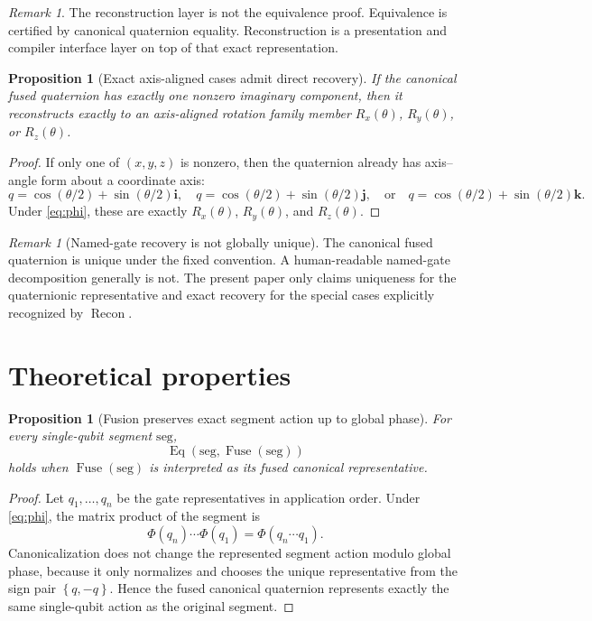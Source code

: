 \documentclass[11pt]{article}
\newtheorem{proposition}[definition]{Proposition}
\theoremstyle{remark}
\newtheorem{remark}[definition]{Remark}
\newcommand{\ii}{\mathbf{i}}
\newcommand{\jj}{\mathbf{j}}
\newcommand{\kk}{\mathbf{k}}
\newcommand{\set}[1]{\left\{ #1 \right\}}
\newcommand{\Fuse}{\operatorname{Fuse}}
\newcommand{\Recon}{\operatorname{Recon}}
\newcommand{\Eq}{\operatorname{Eq}}
\begin{document}
\begin{remark}
The reconstruction layer is not the equivalence proof. Equivalence is certified
by canonical quaternion equality. Reconstruction is a presentation and compiler
interface layer on top of that exact representation.
\end{remark}

\begin{proposition}[Exact axis-aligned cases admit direct recovery]
If the canonical fused quaternion has exactly one nonzero imaginary component,
then it reconstructs exactly to an axis-aligned rotation family member
$R_x(\theta)$, $R_y(\theta)$, or $R_z(\theta)$.
\end{proposition}

\begin{proof}
If only one of $(x,y,z)$ is nonzero, then the quaternion already has
axis--angle form about a coordinate axis:
\[
q=\cos(\theta/2)+\sin(\theta/2)\ii,
\quad
q=\cos(\theta/2)+\sin(\theta/2)\jj,
\quad \text{or} \quad
q=\cos(\theta/2)+\sin(\theta/2)\kk.
\]
Under \eqref{eq:phi}, these are exactly $R_x(\theta)$, $R_y(\theta)$, and
$R_z(\theta)$.
\end{proof}

\begin{remark}[Named-gate recovery is not globally unique]
The canonical fused quaternion is unique under the fixed convention. A
human-readable named-gate decomposition generally is not. The present paper only
claims uniqueness for the quaternionic representative and exact recovery for the
special cases explicitly recognized by $\Recon$.
\end{remark}

\section{Theoretical properties}

\begin{proposition}[Fusion preserves exact segment action up to global phase]
For every single-qubit segment $\mathrm{seg}$,
\[
\Eq(\mathrm{seg},\Fuse(\mathrm{seg}))
\]
holds when $\Fuse(\mathrm{seg})$ is interpreted as its fused canonical
representative.
\end{proposition}

\begin{proof}
Let $q_1,\dots,q_n$ be the gate representatives in application order. Under
\eqref{eq:phi}, the matrix product of the segment is
\[
\Phi(q_n)\cdots\Phi(q_1)=\Phi(q_n\cdots q_1).
\]
Canonicalization does not change the represented segment action modulo global
phase, because it only normalizes and chooses the unique representative from the
sign pair $\set{q,-q}$. Hence the fused canonical quaternion represents exactly
the same single-qubit action as the original segment.
\end{proof}
\end{document}
